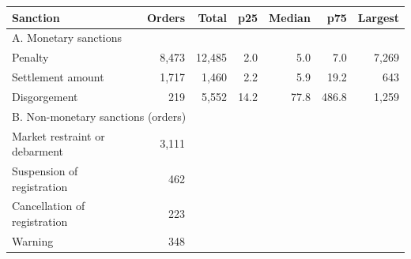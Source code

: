 \begin{tabular*}{\textwidth}[]{l@{\extracolsep\fill}rrrrrr}
\toprule
Sanction & Orders & Total & p25 & Median & p75 & Largest\\
\midrule
\multicolumn{7}{l}{A. Monetary sanctions}\\
Penalty & 8,473 & 12,485 & 2.0 & 5.0 & 7.0 & 7,269\\
Settlement amount & 1,717 & 1,460 & 2.2 & 5.9 & 19.2 & 643\\
Disgorgement & 219 & 5,552 & 14.2 & 77.8 & 486.8 & 1,259\\
\midrule
\multicolumn{7}{l}{B. Non-monetary sanctions (orders)}\\
Market restraint or debarment & 3,111 &  &  &  &  & \\
Suspension of registration & 462 &  &  &  &  & \\
Cancellation of registration & 223 &  &  &  &  & \\
Warning & 348 &  &  &  &  & \\
\bottomrule
\end{tabular*}
